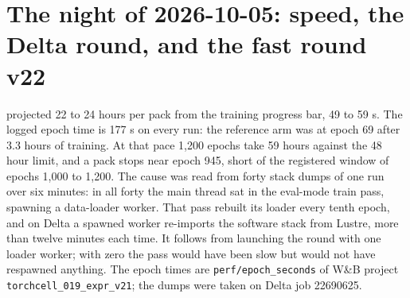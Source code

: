 
\clearpage
\section{The night of 2026-10-05: speed, the Delta round, and the fast round v22}
\label{sec:night}


 
projected 22 to 24 hours per pack from the training progress bar, 49 to 59 s. The logged
epoch time is 177 s on every run: the reference arm was at epoch 69 after 3.3 hours of
training. At that pace 1{,}200 epochs take 59 hours against the 48 hour limit, and a pack
stops near epoch 945, short of the registered window of epochs 1{,}000 to 1{,}200. The cause
was read from forty stack dumps of one run over six minutes: in all forty the main thread
sat in the eval-mode train pass, spawning a data-loader worker. That pass rebuilt its loader
every tenth epoch, and on Delta a spawned worker re-imports the software stack from Lustre,
more than twelve minutes each time. It follows from launching the round with one loader
worker; with zero the pass would have been slow but would not have respawned anything. The
epoch times are \texttt{perf/epoch\_seconds} of W\&B project
\texttt{torchcell\_019\_expr\_v21}; the dumps were taken on Delta job 22690625.

